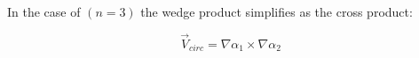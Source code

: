 \documentclass[conf]{new-aiaa}
\begin{document}
In the case of $(n=3)$ the wedge product simplifies as the cross product:

\begin{equation}
\overrightarrow{V}_{circ} =  \nabla\alpha_1 \times \nabla\alpha_2 
\label{circOnlySimp}
\end{equation}

%
%
%



%





\end{document}
